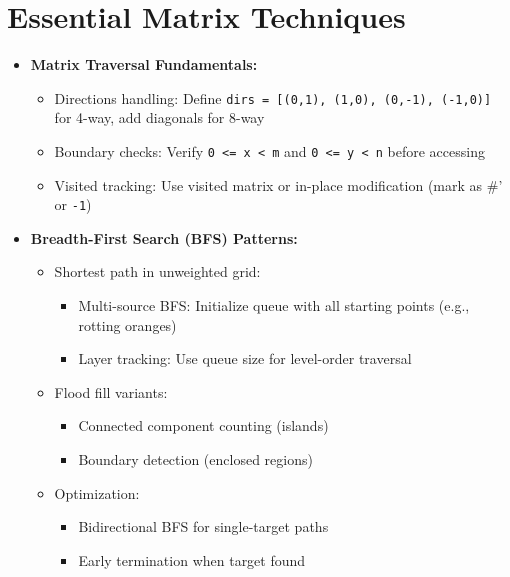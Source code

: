 \documentclass[a4paper,10pt]{book}
\begin{document}
\chapter{Essential Matrix Techniques  }
\label{sec:matrix}
\begin{itemize}
    \item \textbf{Matrix Traversal Fundamentals:}
    \begin{itemize}
        \item Directions handling: Define \texttt{dirs = [(0,1), (1,0), (0,-1), (-1,0)]} for 4-way, add diagonals for 8-way
        \item Boundary checks: Verify \texttt{0 <= x < m} and \texttt{0 <= y < n} before accessing
        \item Visited tracking: Use visited matrix or in-place modification (mark as \#' or \texttt{-1})
    \end{itemize}
    
    \item \textbf{Breadth-First Search (BFS) Patterns:}
    \begin{itemize}
        \item Shortest path in unweighted grid:
        \begin{itemize}
            \item Multi-source BFS: Initialize queue with all starting points (e.g., rotting oranges)
            \item Layer tracking: Use queue size for level-order traversal
        \end{itemize}
        \item Flood fill variants: 
        \begin{itemize}
            \item Connected component counting (islands)
            \item Boundary detection (enclosed regions)
        \end{itemize}
        \item Optimization: 
        \begin{itemize}
            \item Bidirectional BFS for single-target paths
            \item Early termination when target found
        \end{itemize}
    \end{itemize}
    

\end{itemize}
\end{document}
